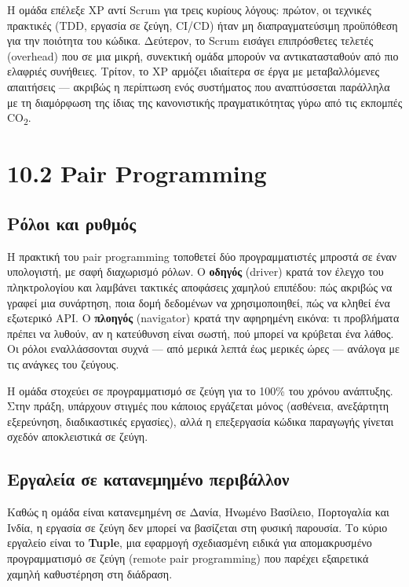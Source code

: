 \documentclass[11pt,a4paper,greek,twoside]{template-xe}
\begin{document}
Η ομάδα επέλεξε XP αντί Scrum για τρεις κυρίους λόγους: πρώτον, οι
τεχνικές πρακτικές (TDD, εργασία σε ζεύγη, CI/CD) ήταν μη
διαπραγματεύσιμη προϋπόθεση για την ποιότητα του κώδικα. Δεύτερον, το
Scrum εισάγει επιπρόσθετες τελετές (overhead) που σε μια μικρή,
συνεκτική ομάδα μπορούν να αντικατασταθούν από πιο ελαφριές συνήθειες.
Τρίτον, το XP αρμόζει ιδιαίτερα σε έργα με μεταβαλλόμενες απαιτήσεις ---
ακριβώς η περίπτωση ενός συστήματος που αναπτύσσεται παράλληλα με τη
διαμόρφωση της ίδιας της κανονιστικής πραγματικότητας γύρω από τις
εκπομπές CO\textsubscript{2}.

\section{10.2 Pair Programming}\label{pair-programming}

\subsection{Ρόλοι και
ρυθμός}\label{ux3c1ux3ccux3bbux3bfux3b9-ux3baux3b1ux3b9-ux3c1ux3c5ux3b8ux3bcux3ccux3c2}

Η πρακτική του pair programming τοποθετεί δύο προγραμματιστές μπροστά σε
έναν υπολογιστή, με σαφή διαχωρισμό ρόλων. Ο \textbf{οδηγός} (driver)
κρατά τον έλεγχο του πληκτρολογίου και λαμβάνει τακτικές αποφάσεις
χαμηλού επιπέδου: πώς ακριβώς να γραφεί μια συνάρτηση, ποια δομή
δεδομένων να χρησιμοποιηθεί, πώς να κληθεί ένα εξωτερικό API. Ο
\textbf{πλοηγός} (navigator) κρατά την αφηρημένη εικόνα: τι προβλήματα
πρέπει να λυθούν, αν η κατεύθυνση είναι σωστή, πού μπορεί να κρύβεται
ένα λάθος. Οι ρόλοι εναλλάσσονται συχνά --- από μερικά λεπτά έως μερικές
ώρες --- ανάλογα με τις ανάγκες του ζεύγους.

Η ομάδα στοχεύει σε προγραμματισμό σε ζεύγη για το 100\% του χρόνου
ανάπτυξης. Στην πράξη, υπάρχουν στιγμές που κάποιος εργάζεται μόνος
(ασθένεια, ανεξάρτητη εξερεύνηση, διαδικαστικές εργασίες), αλλά η
επεξεργασία κώδικα παραγωγής γίνεται σχεδόν αποκλειστικά σε ζεύγη.

\subsection{Εργαλεία σε κατανεμημένο
περιβάλλον}\label{ux3b5ux3c1ux3b3ux3b1ux3bbux3b5ux3afux3b1-ux3c3ux3b5-ux3baux3b1ux3c4ux3b1ux3bdux3b5ux3bcux3b7ux3bcux3adux3bdux3bf-ux3c0ux3b5ux3c1ux3b9ux3b2ux3acux3bbux3bbux3bfux3bd}

Καθώς η ομάδα είναι κατανεμημένη σε Δανία, Ηνωμένο Βασίλειο, Πορτογαλία
και Ινδία, η εργασία σε ζεύγη δεν μπορεί να βασίζεται στη φυσική
παρουσία. Το κύριο εργαλείο είναι το \textbf{Tuple}, μια εφαρμογή
σχεδιασμένη ειδικά για απομακρυσμένο προγραμματισμό σε ζεύγη (remote
pair programming) που παρέχει εξαιρετικά χαμηλή καθυστέρηση στη
διάδραση.
\end{document}
